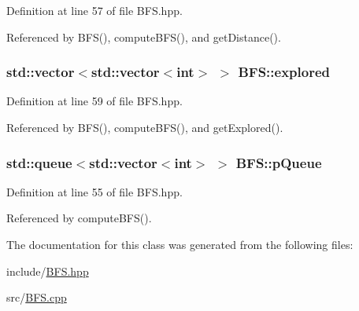 Definition at line 57 of file B\+F\+S.\+hpp.



Referenced by B\+F\+S(), compute\+B\+F\+S(), and get\+Distance().

\subsubsection[{\texorpdfstring{explored}{explored}}]{\setlength{\rightskip}{0pt plus 5cm}std\+::vector$<$std\+::vector$<$int$>$ $>$ B\+F\+S\+::explored\hspace{0.3cm}{\ttfamily [private]}}\hypertarget{classBFS_a2e5bcb2d5e51e544bbd5de47a470186d}{}\label{classBFS_a2e5bcb2d5e51e544bbd5de47a470186d}


Definition at line 59 of file B\+F\+S.\+hpp.



Referenced by B\+F\+S(), compute\+B\+F\+S(), and get\+Explored().

\subsubsection[{\texorpdfstring{p\+Queue}{pQueue}}]{\setlength{\rightskip}{0pt plus 5cm}std\+::queue$<$std\+::vector$<$int$>$ $>$ B\+F\+S\+::p\+Queue\hspace{0.3cm}{\ttfamily [private]}}\hypertarget{classBFS_a408e3b926379694275b0a1c967c12839}{}\label{classBFS_a408e3b926379694275b0a1c967c12839}


Definition at line 55 of file B\+F\+S.\+hpp.



Referenced by compute\+B\+F\+S().



The documentation for this class was generated from the following files\+:\begin{DoxyCompactItemize}
\item 
include/\hyperlink{BFS_8hpp}{B\+F\+S.\+hpp}\item 
src/\hyperlink{BFS_8cpp}{B\+F\+S.\+cpp}\end{DoxyCompactItemize}
